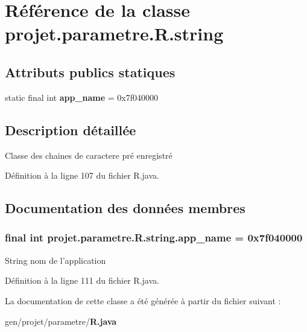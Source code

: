 \section{\-Référence de la classe projet.\-parametre.\-R.\-string}
\label{classprojet_1_1parametre_1_1_r_1_1string}
\subsection*{\-Attributs publics statiques}
\begin{DoxyCompactItemize}
\item 
static final int {\bf app\-\_\-name} = 0x7f040000
\end{DoxyCompactItemize}


\subsection{\-Description détaillée}
\-Classe des chaines de caractere pré enregistré 

\-Définition à la ligne 107 du fichier \-R.\-java.



\subsection{\-Documentation des données membres}
\subsubsection[{app\-\_\-name}]{\setlength{\rightskip}{0pt plus 5cm}final int {\bf projet.\-parametre.\-R.\-string.\-app\-\_\-name} = 0x7f040000\hspace{0.3cm}{\ttfamily  [static]}}\label{classprojet_1_1parametre_1_1_r_1_1string_ac9f9e19081e6b9a952c0d6a9ae323ee3}
\-String nom de l'application 

\-Définition à la ligne 111 du fichier \-R.\-java.



\-La documentation de cette classe a été générée à partir du fichier suivant \-:\begin{DoxyCompactItemize}
\item 
gen/projet/parametre/{\bf \-R.\-java}\end{DoxyCompactItemize}
